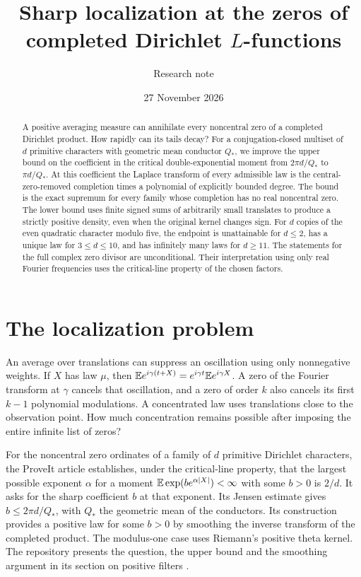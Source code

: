 \documentclass[11pt,letterpaper]{article}
\title{Sharp localization at the zeros of completed Dirichlet \texorpdfstring{$L$}{L}-functions}
\author{Research note}\date{27 November 2026}
\begin{document}
\maketitle
\begin{abstract}
A positive averaging measure can annihilate every noncentral zero of a completed Dirichlet product. How rapidly can its tails decay? For a conjugation-closed multiset of $d$ primitive characters with geometric mean conductor $Q_*$, we improve the upper bound on the coefficient in the critical double-exponential moment from $2\pi d/Q_*$ to $\pi d/Q_*$. At this coefficient the Laplace transform of every admissible law is the central-zero-removed completion times a polynomial of explicitly bounded degree. The bound is the exact supremum for every family whose completion has no real noncentral zero. The lower bound uses finite signed sums of arbitrarily small translates to produce a strictly positive density, even when the original kernel changes sign. For $d$ copies of the even quadratic character modulo five, the endpoint is unattainable for $d\le2$, has a unique law for $3\le d\le10$, and has infinitely many laws for $d\ge11$. The statements for the full complex zero divisor are unconditional. Their interpretation using only real Fourier frequencies uses the critical-line property of the chosen factors.
\end{abstract}

\section{The localization problem}
An average over translations can suppress an oscillation using only nonnegative weights. If $X$ has law $\mu$, then $\mathbb E e^{i\gamma(t+X)}=e^{i\gamma t}\mathbb E e^{i\gamma X}$. A zero of the Fourier transform at $\gamma$ cancels that oscillation, and a zero of order $k$ also cancels its first $k-1$ polynomial modulations. A concentrated law uses translations close to the observation point. How much concentration remains possible after imposing the entire infinite list of zeros?

For the noncentral zero ordinates of a family of $d$ primitive Dirichlet characters, the ProveIt article establishes, under the critical-line property, that the largest possible exponent $\alpha$ for a moment $\mathbb E\exp(b e^{\alpha|X|})<\infty$ with some $b>0$ is $2/d$. It asks for the sharp coefficient $b$ at that exponent. Its Jensen estimate gives $b\le2\pi d/Q_*$, with $Q_*$ the geometric mean of the conductors. Its construction provides a positive law for some $b>0$ by smoothing the inverse transform of the completed product. The modulus-one case uses Riemann's positive theta kernel. The repository presents the question, the upper bound and the smoothing argument in its section on positive filters \cite{proveit,riemann}.
\end{document}
